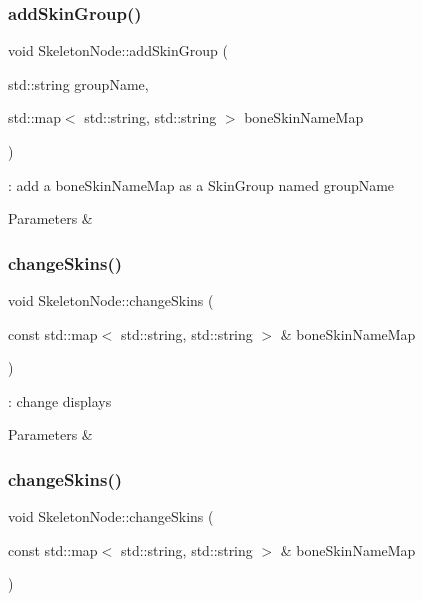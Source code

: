 \subsubsection{\texorpdfstring{add\+Skin\+Group()}{addSkinGroup()}\hspace{0.1cm}{\footnotesize\ttfamily [2/2]}}
{\footnotesize\ttfamily void Skeleton\+Node\+::add\+Skin\+Group (\begin{DoxyParamCaption}\item[{std\+::string}]{group\+Name,  }\item[{std\+::map$<$ std\+::string, std\+::string $>$}]{bone\+Skin\+Name\+Map }\end{DoxyParamCaption})}



\+: add a bone\+Skin\+Name\+Map as a Skin\+Group named group\+Name 


\begin{DoxyParams}{Parameters}
{\em } & \\
\hline
\end{DoxyParams}
\mbox{\label{classSkeletonNode_a29dd03517b18a7d12f50542ddf3f42f2}} 
\subsubsection{\texorpdfstring{change\+Skins()}{changeSkins()}\hspace{0.1cm}{\footnotesize\ttfamily [1/4]}}
{\footnotesize\ttfamily void Skeleton\+Node\+::change\+Skins (\begin{DoxyParamCaption}\item[{const std\+::map$<$ std\+::string, std\+::string $>$ \&}]{bone\+Skin\+Name\+Map }\end{DoxyParamCaption})}



\+: change displays 


\begin{DoxyParams}{Parameters}
{\em } & \\
\hline
\end{DoxyParams}
\mbox{\label{classSkeletonNode_a29dd03517b18a7d12f50542ddf3f42f2}} 
\subsubsection{\texorpdfstring{change\+Skins()}{changeSkins()}\hspace{0.1cm}{\footnotesize\ttfamily [2/4]}}
{\footnotesize\ttfamily void Skeleton\+Node\+::change\+Skins (\begin{DoxyParamCaption}\item[{const std\+::map$<$ std\+::string, std\+::string $>$ \&}]{bone\+Skin\+Name\+Map }\end{DoxyParamCaption})}



